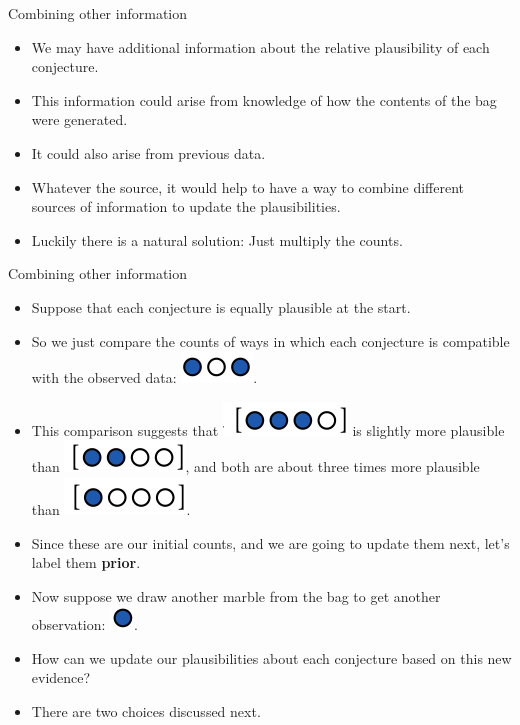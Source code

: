 \documentclass[handout]{beamer}
\begin{document}
\begin{frame}{Combining other information}
\scriptsize{
\begin{itemize}
 \item We may have additional information about the relative plausibility of each conjecture. 
 \item This information could arise from knowledge of how the contents of the bag were generated. 
 \item It could also arise from previous data. 
 \item Whatever the source, it would help to have a way to combine different sources of information to update the plausibilities. 
 \item Luckily there is a natural solution: Just multiply the counts.
\end{itemize}
 } 
\end{frame}


\begin{frame}{Combining other information}
\scriptsize{
\begin{itemize}
 \item Suppose that each conjecture is equally plausible at the start.
 \item So we just compare the counts of ways in which each conjecture is compatible with the observed data: \includegraphics[scale=0.3]{pics/marbles2.png}.
 \item This comparison suggests that \includegraphics[scale=0.3]{pics/marbles14.png} is slightly more plausible than \includegraphics[scale=0.3]{pics/marbles13.png}, and both are about three times more plausible than \includegraphics[scale=0.3]{pics/marbles3.png}. 
\item Since these are our initial counts, and we are going to update them next, let's label them \textbf{prior}.
\item Now suppose we draw another marble from the bag to get another observation: \includegraphics[scale=0.3]{pics/marbles6.png}. 
\item How can we update our plausibilities about each conjecture based on this new evidence?
\item There are two choices discussed next. 
\end{itemize}
 } 
\end{frame}
\end{document}
